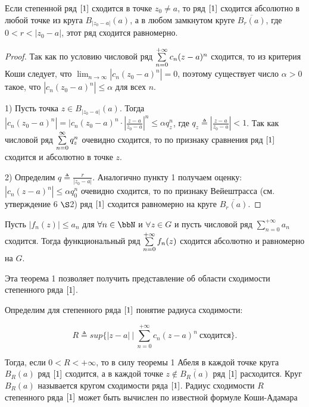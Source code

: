 \begin{thm}[Абель] \label{T1}
Если степенной ряд $\eqref{1}$ сходится в точке $z_0 \not= a$, то ряд $\eqref{1}$ сходится абсолютно в любой точке из круга $B_{|z_0 - a|}(a)$, а в любом замкнутом круге $\overline{B_{r}(a)}$, где $0 < r < |z_0 - a|$, этот ряд сходится равномерно.
\end{thm}

\begin{proof}
Так как по условию числовой ряд $\sum_{n = 0}^{+\infty}\limits c_n (z - a)^n$ сходится, то из критерия Коши следует, что $\lim_{n \to \infty} |c_n(z_0 - a)^n| = 0$, поэтому существует число $\alpha > 0$ такое, что $|c_n(z_0 - a)^n| \le \alpha$ для всех $n$.

1) Пусть точка $z \in B_{|z_0 - a|}(a)$. Тогда $|c_n(z_0 - a)^n| = |c_n(z_0 - a)^n \cdot \left| \frac{z - a}{z_0 - a} \right|^n \le \alpha q^{n}_z$, где $q_z \triangleq \left| \frac{z - a}{z_0 - a} \right| < 1$. Так как числовой ряд $\sum_{n = 0}^{\infty}\limits q_{z}^n$ очевидно сходится, то по признаку сравнения ряд $\eqref{1}$ сходится и абсолютно в точке $z$.

2) Определим $q \triangleq \frac{r}{|z_0 - a|}$. Аналогично пункту 1 получаем оценку: $|c_n(z - a)^n| \le \alpha q^{n}_0$ очевидно сходится, то по признаку Вейештрасса (см. утверждение 6 $\S$2) ряд $\eqref{1}$ сходится равномерно на круге $\overline{B_{r}(a)}$.

\end{proof}

\begin{stt}
Пусть $|f_n(z)| \le a_n$ для $\forall n \in \bbN$ и $\forall z \in G$ и пусть числовой ряд $\sum_{n = 0}^{+\infty} a_n$ сходится. Тогда функциональный ряд $\sum_{n = 0}^{+\infty}\limits f_n(z)$ сходится абсолютно и равномерно на $G$. 
\end{stt}

Эта теорема 1 позволяет получить представление об области сходимости степенного ряда $\eqref{1}$.

Определим для степенного ряда $\eqref{1}$ понятие $\textit{радиуса сходимости}$:

\begin{equation} \label{2}
R \triangleq sup \{ |z - a| \: \big| \: \sum_{n = 0}^{+\infty} c_n (z - a)^n \: \text{сходится} \}.
\end{equation}

Тогда, если $0 < R < +\infty$, то в силу теоремы 1 Абеля в каждой точке круга $B_R(a)$ ряд $\eqref{1}$ сходится, а в каждой точке $z \notin \overline{B_R(a)}$ ряд $\eqref{1}$ расходится. Круг $B_R(a)$ называется кругом сходимости ряда $\eqref{1}$.
Радиус сходимости $R$ степенного ряда $\eqref{1}$ может быть вычислен по известной формуле Коши-Адамара

